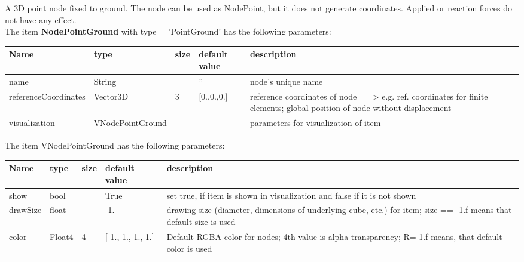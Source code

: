 A 3D point node fixed to ground. The node can be used as NodePoint, but it does not generate coordinates. Applied or reaction forces do not have any effect.
 \\\vspace{12pt} \noindent The item {\bf NodePointGround} with type = 'PointGround' has the following parameters:\vspace{-1cm}\\ 
\begin{center}
  \footnotesize
  \begin{longtable}{| p{4.5cm} | p{2.5cm} | p{0.5cm} | p{2.5cm} | p{6cm} |}
    \hline
    \bf Name & \bf type & \bf size & \bf default value & \bf description \\ \hline
    name &     String &      &     '' &     node's unique name\\ \hline
    referenceCoordinates &     Vector3D &     3 &     [0.,0.,0.] &     reference coordinates of node ==> e.g. ref. coordinates for finite elements; global position of node without displacement\\ \hline
    visualization & VNodePointGround & & & parameters for visualization of item \\ \hline
	  \end{longtable}
	\end{center}
The item VNodePointGround has the following parameters:\vspace{-1cm}\\ 
\begin{center}
  \footnotesize
  \begin{longtable}{| p{4.5cm} | p{2.5cm} | p{0.5cm} | p{2.5cm} | p{6cm} |}
    \hline
    \bf Name & \bf type & \bf size & \bf default value & \bf description \\ \hline
    show &     bool &      &     True &     set true, if item is shown in visualization and false if it is not shown\\ \hline
    drawSize &     float &      &     -1. &     drawing size (diameter, dimensions of underlying cube, etc.)  for item; size == -1.f means that default size is used\\ \hline
    color &     Float4 &     4 &     [-1.,-1.,-1.,-1.] &     Default RGBA color for nodes; 4th value is alpha-transparency; R=-1.f means, that default color is used\\ \hline
	  \end{longtable}
	\end{center}


